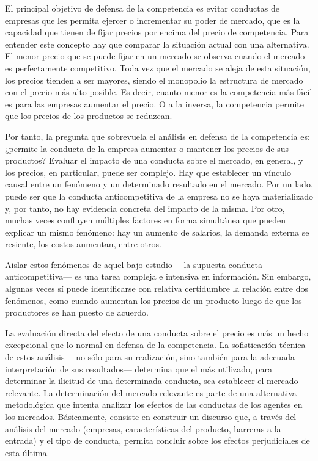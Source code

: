 \documentclass[
  12pt,
  spanish,
]{book}
\begin{document}
El principal objetivo de defensa de la competencia es evitar conductas
de empresas que les permita ejercer o incrementar su poder de mercado,
que es la capacidad que tienen de fijar precios por encima del precio de
competencia. Para entender este concepto hay que comparar la situación
actual con una alternativa. El menor precio que se puede fijar en un
mercado se observa cuando el mercado es perfectamente competitivo. Toda
vez que el mercado se aleja de esta situación, los precios tienden a ser
mayores, siendo el monopolio la estructura de mercado con el precio más
alto posible. Es decir, cuanto menor es la competencia más fácil es para
las empresas aumentar el precio. O a la inversa, la competencia permite
que los precios de los productos se reduzcan.

Por tanto, la pregunta que sobrevuela el análisis en defensa de la
competencia es: ¿permite la conducta de la empresa aumentar o mantener
los precios de sus productos? Evaluar el impacto de una conducta sobre
el mercado, en general, y los precios, en particular, puede ser
complejo. Hay que establecer un vínculo causal entre un fenómeno y un
determinado resultado en el mercado. Por un lado, puede ser que la
conducta anticompetitiva de la empresa no se haya materializado y, por
tanto, no hay evidencia concreta del impacto de la misma. Por otro,
muchas veces confluyen múltiples factores en forma simultánea que pueden
explicar un mismo fenómeno: hay un aumento de salarios, la demanda
externa se resiente, los costos aumentan, entre otros.

Aislar estos fenómenos de aquel bajo estudio ---la supuesta conducta
anticompetitiva--- es una tarea compleja e intensiva en información. Sin
embargo, algunas veces sí puede identificarse con relativa certidumbre
la relación entre dos fenómenos, como cuando aumentan los precios de un
producto luego de que los productores se han puesto de acuerdo.

La evaluación directa del efecto de una conducta sobre el precio es más
un hecho excepcional que lo normal en defensa de la competencia. La
sofisticación técnica de estos análisis ---no sólo para su realización,
sino también para la adecuada interpretación de sus resultados---
determina que el más utilizado, para determinar la ilicitud de una
determinada conducta, sea establecer el mercado relevante. La
determinación del mercado relevante es parte de una alternativa
metodológica que intenta analizar los efectos de las conductas de los
agentes en los mercados. Básicamente, consiste en construir un discurso
que, a través del análisis del mercado (empresas, características del
producto, barreras a la entrada) y el tipo de conducta, permita concluir
sobre los efectos perjudiciales de esta última.
\end{document}
